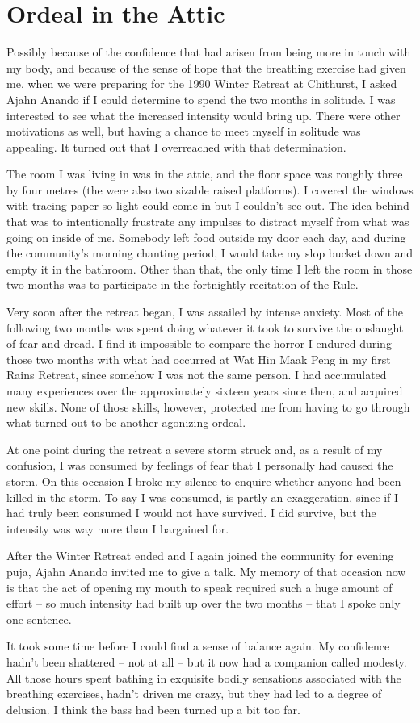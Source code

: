 \chapter{Ordeal in the Attic}

Possibly because of the confidence that had arisen from being more in
touch with my body, and because of the sense of hope that the breathing
exercise had given me, when we were preparing for the 1990 Winter
Retreat at Chithurst, I asked Ajahn Anando if I could determine to spend
the two months in solitude. I was interested to see what the increased
intensity would bring up. There were other motivations as well, but
having a chance to meet myself in solitude was appealing. It turned out
that I overreached with that determination.

The room I was living in was in the attic, and the floor space was
roughly three by four metres (the were also two sizable raised
platforms). I covered the windows with tracing paper so light could come
in but I couldn't see out. The idea behind that was to intentionally
frustrate any impulses to distract myself from what was going on inside
of me. Somebody left food outside my door each day, and during the
community's morning chanting period, I would take my slop bucket down
and empty it in the bathroom. Other than that, the only time I left the
room in those two months was to participate in the fortnightly
recitation of the Rule.

Very soon after the retreat began, I was assailed by intense anxiety.
Most of the following two months was spent doing whatever it took to
survive the onslaught of fear and dread. I find it impossible to compare
the horror I endured during those two months with what had occurred at
Wat Hin Maak Peng in my first Rains Retreat, since somehow I was not the
same person. I had accumulated many experiences over the approximately
sixteen years since then, and acquired new skills. None of those skills,
however, protected me from having to go through what turned out to be
another agonizing ordeal.

At one point during the retreat a severe storm struck and, as a result
of my confusion, I was consumed by feelings of fear that I personally
had caused the storm. On this occasion I broke my silence to enquire
whether anyone had been killed in the storm. To say I was consumed, is
partly an exaggeration, since if I had truly been consumed I would not
have survived. I did survive, but the intensity was way more than I
bargained for.

After the Winter Retreat ended and I again joined the community for
evening puja, Ajahn Anando invited me to give a talk. My memory of that
occasion now is that the act of opening my mouth to speak required such
a huge amount of effort -- so much intensity had built up over the two
months -- that I spoke only one sentence.

It took some time before I could find a sense of balance again. My
confidence hadn't been shattered -- not at all -- but it now had a
companion called modesty. All those hours spent bathing in exquisite
bodily sensations associated with the breathing exercises, hadn't driven
me crazy, but they had led to a degree of delusion. I think the bass had
been turned up a bit too far.


